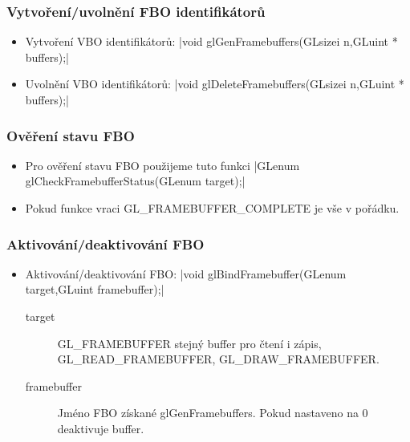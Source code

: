 \begin{frame}[fragile]
\frametitle{Vytvoření/uvolnění FBO identifikátorů}
  \begin{itemize}
    \item{
    Vytvoření VBO identifikátorů:
    {\scriptsize
    |void glGenFramebuffers(GLsizei n,GLuint * buffers);|
    }}
    \item{
    Uvolnění VBO identifikátorů:
    {\scriptsize
    |void glDeleteFramebuffers(GLsizei n,GLuint * buffers);|
    }}
  \end{itemize}
\end{frame}

\begin{frame}[fragile]
\frametitle{Ověření stavu FBO}
  \begin{itemize}
    \item{
    Pro ověření stavu FBO použijeme tuto funkci
    {\scriptsize
    |GLenum glCheckFramebufferStatus(GLenum target);|
    }}
    \item{
    Pokud funkce vraci {\color{red} GL\_FRAMEBUFFER\_COMPLETE} je vše v pořádku.
    }
  \end{itemize}
\end{frame}


\begin{frame}[fragile]
\frametitle{Aktivování/deaktivování FBO}
  \begin{itemize}
    \item{
    Aktivování/deaktivování FBO:
    {\scriptsize
    |void glBindFramebuffer(GLenum target,GLuint framebuffer);|
    }
    \begin{description}
    \item[target] GL\_FRAMEBUFFER stejný buffer pro čtení i zápis, GL\_READ\_FRAMEBUFFER, GL\_DRAW\_FRAMEBUFFER.
    \item[framebuffer] Jméno FBO získané {\color{blue} glGenFramebuffers}.
    Pokud nastaveno na 0 deaktivuje buffer.
    \end{description}
    }
  \end{itemize}
\end{frame}


